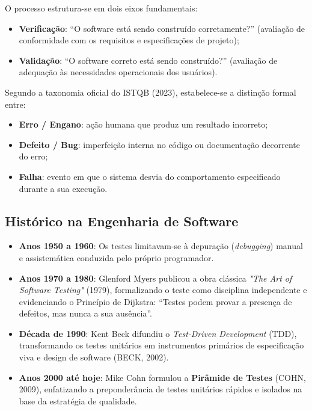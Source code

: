 \documentclass[12pt,a4paper]{article}
\begin{document}
O processo estrutura-se em dois eixos fundamentais:
\begin{itemize}
    \item \textbf{Verificação}: ``O software está sendo construído corretamente?'' (avaliação de conformidade com os requisitos e especificações de projeto);
    \item \textbf{Validação}: ``O software correto está sendo construído?'' (avaliação de adequação às necessidades operacionais dos usuários).
\end{itemize}

Segundo a taxonomia oficial do ISTQB (2023), estabelece-se a distinção formal entre:
\begin{itemize}
    \item \textbf{Erro / Engano}: ação humana que produz um resultado incorreto;
    \item \textbf{Defeito / Bug}: imperfeição interna no código ou documentação decorrente do erro;
    \item \textbf{Falha}: evento em que o sistema desvia do comportamento especificado durante a sua execução.
\end{itemize}

\subsection{Histórico na Engenharia de Software}
\begin{itemize}
    \item \textbf{Anos 1950 a 1960}: Os testes limitavam-se à depuração (\textit{debugging}) manual e assistemática conduzida pelo próprio programador.
    \item \textbf{Anos 1970 a 1980}: Glenford Myers publicou a obra clássica \textit{"The Art of Software Testing"} (1979), formalizando o teste como disciplina independente e evidenciando o Princípio de Dijkstra: ``Testes podem provar a presença de defeitos, mas nunca a sua ausência''.
    \item \textbf{Década de 1990}: Kent Beck difundiu o \textit{Test-Driven Development} (TDD), transformando os testes unitários em instrumentos primários de especificação viva e design de software (BECK, 2002).
    \item \textbf{Anos 2000 até hoje}: Mike Cohn formulou a \textbf{Pirâmide de Testes} (COHN, 2009), enfatizando a preponderância de testes unitários rápidos e isolados na base da estratégia de qualidade.
\end{itemize}
\end{document}
